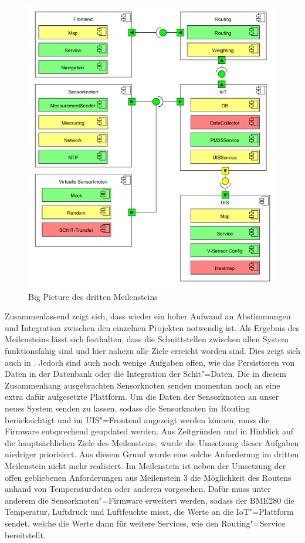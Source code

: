 \begin{figure}[!htb]
	\centering
	\includegraphics[width=\textwidth]{./ressourcen/bigpicture2.png}
	\caption{Big Picture des dritten Meilensteins}
	\label{fig:bigpicture2}
\end{figure}


Zusammenfassend zeigt sich, dass wieder ein hoher Aufwand an Abstimmungen und Integration zwischen den einzelnen Projekten notwendig ist.
Als Ergebnis des Meilensteins lässt sich festhalten, dass die Schnittstellen zwischen allen System funktionsfähig sind und hier nahezu alle Ziele erreicht worden sind.
Dies zeigt sich auch in .
Jedoch sind auch noch wenige Aufgaben offen, wie das Persistieren von Daten in der Datenbank oder die Integration der Schit"=Daten.
Die in diesem Zusammenhang ausgebrachten Sensorknoten senden momentan noch an eine extra dafür aufgesetzte Plattform.
Um die Daten der Sensorknoten an unser neues System senden zu lassen, sodass die Sensorknoten im Routing berücksichtigt und im UIS"=Frontend angezeigt werden können, muss die Firmware entsprechend geupdated werden.
Aus Zeitgründen und in Hinblick auf die hauptsächlichen Ziele des Meilensteins, wurde die Umsetzung dieser Aufgaben niedriger priorisiert.
Aus diesem Grund wurde eine solche Anforderung im dritten Meilenstein nicht mehr realisiert.
Im Meilenstein ist neben der Umsetzung der offen gebliebenen Anforderungen aus Meilenstein 3 die Möglichkeit des Routens anhand von Temperaturdaten oder anderen vorgesehen.
Dafür muss unter anderem die Sensorknoten"=Firmware erweitert werden, sodass der BME280 die Temperatur, Luftdruck und Luftfeuchte misst, die Werte an die IoT"=Plattform sendet, welche die Werte dann für weitere Services, wie den Routing"=Service bereitstellt.